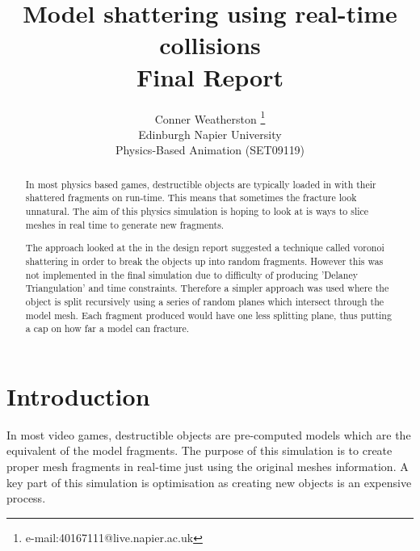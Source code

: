 \documentclass[conference,backref=page]{acmsiggraph}
\title{Model shattering using real-time collisions\\
	   Final Report}
\author{Conner Weatherston \thanks{e-mail:40167111@live.napier.ac.uk} \\
Edinburgh Napier University\\
Physics-Based Animation (SET09119)}
\begin{document}

\maketitle

\raggedbottom

\begin{abstract}
In most physics based games, destructible objects are typically loaded in with their shattered fragments on run-time. This means that sometimes the fracture look unnatural. The aim of this physics simulation is hoping to look at is ways to slice meshes in real time to generate new fragments.

The approach looked at the in the design report suggested a technique called voronoi shattering \cite{voronoishattering} in order to break the objects up into random fragments. However this was not implemented in the final simulation due to difficulty of producing 'Delaney Triangulation' and time constraints. Therefore a simpler approach was used where the object is split recursively using a series of random planes which intersect through the model mesh. Each fragment produced would have one less splitting plane, thus putting a cap on how far a model can fracture.

\end{abstract}

\keywordlist

\section{Introduction}

In most video games, destructible objects are pre-computed models which are the equivalent of the model fragments. The purpose of this simulation is to create proper mesh fragments in real-time just using the original meshes information. A key part of this simulation is optimisation as creating new objects is an expensive process.
\end{document}
